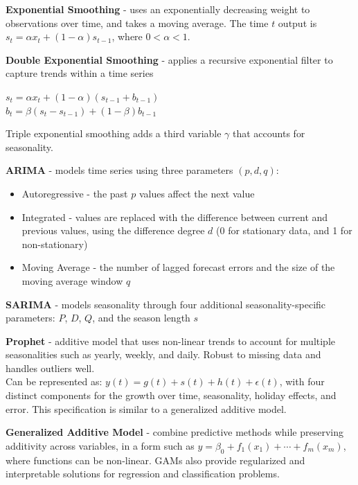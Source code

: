 \documentclass[10pt,landscape]{article}
\begin{document}
\begin{multicols}{3}
\textbf{Exponential Smoothing} - uses an exponentially decreasing weight to observations over time, and takes a moving average. The time $t$ output is $s_t = \alpha x_t + (1-\alpha)s_{t-1}$, where  $0 < \alpha < 1$.
\smallskip

\textbf{Double Exponential Smoothing} - applies a recursive exponential filter to capture trends within a time series
    \begin{center}
    \vspace{-2.5mm}
    $s_t = \alpha x_t + (1-\alpha)(s_{t-1} + b_{t-1})$\\
    $b_t = \beta (s_t - s_{t-1}) + (1-\beta)b_{t-1}$\\
    \vspace{-2mm}
    \end{center}
Triple exponential smoothing adds a third variable
$\gamma$ that accounts for seasonality.
\smallskip

\textbf{ARIMA} - models time series using three parameters $(p,d,q)$:
\begin{itemize}[label={--},leftmargin=4mm]
\itemsep -.4mm
\item Autoregressive - the past $p$ values affect the next value

\item Integrated - values are replaced with the difference between current and previous values, using the difference degree $d$ (0 for stationary data, and 1 for non-stationary)

\item Moving Average - the number of lagged forecast errors and the size of the moving average window $q$
\end{itemize}

\textbf{SARIMA} - models seasonality through four additional seasonality-specific parameters: $P$, $D$, $Q$, and the season length $s$
\smallskip

\textbf{Prophet} - additive model that uses non-linear trends to account for multiple seasonalities such as yearly, weekly, and daily. Robust to missing data and handles outliers well.\\ Can be represented as: $y(t) = g(t) + s(t) + h(t) + \epsilon(t)$, with four distinct components for the growth over time, seasonality, holiday effects, and error. This specification is similar to a generalized additive model.
\smallskip

\textbf{Generalized Additive Model} - combine predictive methods while preserving additivity across variables, in a form such as
$y = \beta_0 + f_1(x_1) + \cdots + f_m(x_m)$, where functions can be non-linear. GAMs also provide regularized and interpretable solutions for regression and classification problems.


\end{multicols}
\end{document}
